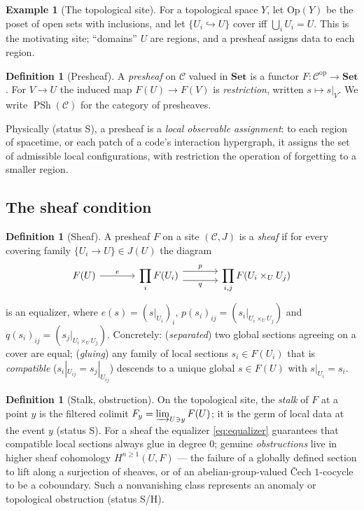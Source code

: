 \documentclass[12pt]{article}
\theoremstyle{definition}
\newtheorem{definition}[theorem]{Definition}
\newtheorem{example}[theorem]{Example}
\theoremstyle{remark}
\newcommand{\cat}[1]{\mathcal{#1}}
\newcommand{\Set}{\mathbf{Set}}
\newcommand{\op}{\mathrm{op}}
\newcommand{\Ss}{\textsf{S}}
\newcommand{\Hh}{\textsf{H}}
\DeclareMathOperator{\PSh}{PSh}
\begin{document}
\begin{example}[The topological site]
\label{ex:top-site}
For a topological space $Y$, let $\mathrm{Op}(Y)$ be the poset of open sets with
inclusions, and let $\{U_i\hookrightarrow U\}$ cover iff $\bigcup_i U_i = U$. This is the
motivating site; ``domains'' $U$ are regions, and a presheaf assigns data to each
region.
\end{example}

\begin{definition}[Presheaf]
\label{def:presheaf}
A \emph{presheaf} on $\cat C$ valued in $\Set$ is a functor
$F:\cat C^{\op}\to\Set$. For $V\to U$ the induced map $F(U)\to F(V)$ is
\emph{restriction}, written $s\mapsto s|_V$. We write $\PSh(\cat C)$ for the category
of presheaves.
\end{definition}

Physically (status \Ss), a presheaf is a \emph{local observable assignment}: to each
region of spacetime, or each patch of a code's interaction hypergraph, it assigns the set of
admissible local configurations, with restriction the operation of forgetting to a
smaller region.

\subsection{The sheaf condition}

\begin{definition}[Sheaf]
\label{def:sheaf}
A presheaf $F$ on a site $(\cat C, J)$ is a \emph{sheaf} if for every covering family
$\{U_i\to U\}\in J(U)$ the diagram
\begin{equation}
\begin{tikzcd}[column sep=large]
F(U) \arrow[r, "e"] &
\displaystyle\prod_i F(U_i)
\arrow[r, shift left=1.1ex, "p"]
\arrow[r, shift right=1.1ex, swap, "q"] &
\displaystyle\prod_{i,j} F(U_i\times_U U_j)
\end{tikzcd}
\label{eq:equalizer}
\end{equation}
is an equalizer, where $e(s)=(s|_{U_i})_i$, $p(s_i)_{ij}=(s_i|_{U_i\times_U U_j})$ and
$q(s_i)_{ij}=(s_j|_{U_i\times_U U_j})$. Concretely: (\emph{separated}) two global
sections agreeing on a cover are equal; (\emph{gluing}) any family of local sections
$s_i\in F(U_i)$ that is \emph{compatible} ($s_i|_{U_{ij}}=s_j|_{U_{ij}}$) descends to a
unique global $s\in F(U)$ with $s|_{U_i}=s_i$.
\end{definition}

\begin{definition}[Stalk, obstruction]
\label{def:stalk}
On the topological site, the \emph{stalk} of $F$ at a point $y$ is the filtered
colimit $F_y=\varinjlim_{U\ni y}F(U)$; it is the germ of local data at the event $y$
(status \Ss). For a sheaf the equalizer \eqref{eq:equalizer} guarantees that compatible
local sections always glue in degree $0$; genuine \emph{obstructions} live in higher
sheaf cohomology $H^{n\ge 1}(U,F)$ --- the failure of a globally defined section to lift
along a surjection of sheaves, or of an abelian-group-valued \v{C}ech $1$-cocycle to be
a coboundary. Such a nonvanishing class represents an anomaly or topological obstruction
(status \Ss/\Hh).
\end{definition}
\end{document}

